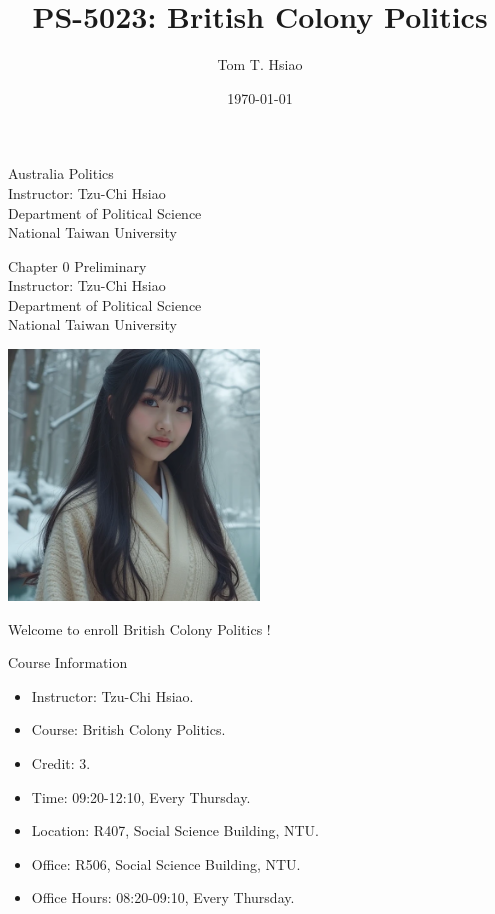 \documentclass{beamer}
\title{PS-5023: British Colony Politics}
\author{Tom T. Hsiao}
\date{\today}
\begin{document}
\begin{frame}
\begin{center}
\Large{Australia Politics} \\
\vspace{3em}
\normalsize{Instructor: Tzu-Chi Hsiao} \\
\vspace{3em}
\small{Department of Political Science} \\
\vspace{1em}
\small{National Taiwan University}
\end{center}
\end{frame}
\begin{frame}
\begin{center}
\Large{Chapter 0 Preliminary} \\
\vspace{3em}
\normalsize{Instructor: Tzu-Chi Hsiao} \\
\vspace{3em}
\small{Department of Political Science} \\
\vspace{1em}
\small{National Taiwan University} \\
\end{center}
\end{frame}
\begin{frame}{}
\begin{center}
\includegraphics[width=0.5\textwidth]{instructor.png}
\end{center}
\vspace{1em}
\begin{center}
\Large{Welcome to enroll British Colony Politics !}
\end{center}
\end{frame}
\begin{frame}{Course Information}
\begin{itemize}
\item Instructor: Tzu-Chi Hsiao.
\item Course: British Colony Politics.
\item Credit: 3.
\item Time: 09:20-12:10, Every Thursday.
\item Location: R407, Social Science Building, NTU. 
\item Office: R506, Social Science Building, NTU.
\item Office Hours: 08:20-09:10, Every Thursday.
\end{itemize}
\end{frame}
\end{document}
